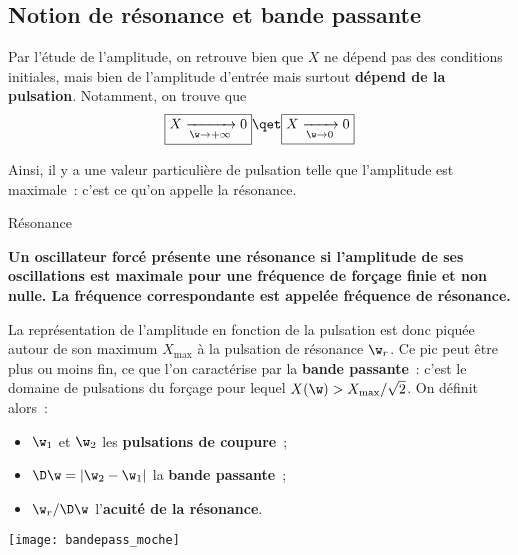 \documentclass[../main/main.tex]{subfiles}
\begin{document}
\subsection{Notion de résonance et bande passante}
Par l'étude de l'amplitude, on retrouve bien que $X$ ne dépend pas des
conditions initiales, mais bien de l'amplitude d'entrée mais surtout
\textbf{dépend de la pulsation}. Notamment, on trouve que
\begin{gather*}
    \boxed{X \xrightarrow[\w\rightarrow+\infty]{} 0}
    \qet
    \boxed{X \xrightarrow[\w\rightarrow0]{} 0}
\end{gather*}

Ainsi, il y a une valeur particulière de pulsation telle que l'amplitude est
maximale~: c'est ce qu'on appelle la résonance.

\begin{NCdefi}[width=\linewidth]{Résonance}
    \begin{center}
        \bfseries
        Un oscillateur forcé présente une résonance si l’amplitude de ses
        oscillations est maximale pour une fréquence de forçage finie et non
        nulle. La fréquence correspondante est appelée fréquence de résonance.
    \end{center}
\end{NCdefi}

\begin{minipage}{0.55\linewidth}
    La représentation de l'amplitude en fonction de la pulsation est donc piquée
    autour de son maximum $X_{\max}$ à la pulsation de résonance $\w_r$. Ce pic
    peut être plus ou moins fin, ce que l'on caractérise par la \textbf{bande
    passante}~: c'est le domaine de pulsations du forçage pour lequel $X(\w) >
    X_{\max}/\sqrt{2}$. On définit alors~:
    \begin{itemize}
        \item $\w_1$ et $\w_2$ les \textbf{pulsations de coupure}~;
        \item $\D\w = \left| \w_2 - \w_1 \right|$ la \textbf{bande passante}~;
        \item $\w_r/\D\w$ l'\textbf{acuité de la résonance}.
    \end{itemize}
\end{minipage}
\hfill
\begin{minipage}{0.40\linewidth}
    \begin{center}
        \texttt{[image: bandepass\_moche]}
    \end{center}
\end{minipage}
\end{document}
